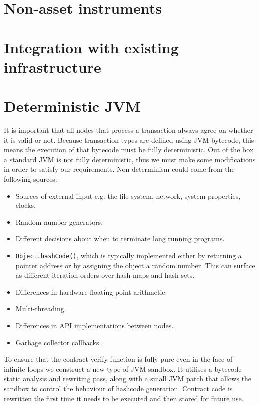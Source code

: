 \documentclass{article}
\begin{document}

\section{Non-asset instruments}
\section{Integration with existing infrastructure}

\section{Deterministic JVM}

It is important that all nodes that process a transaction always agree on whether it is valid or not. Because
transaction types are defined using JVM bytecode, this means the execution of that bytecode must be fully
deterministic. Out of the box a standard JVM is not fully deterministic, thus we must make some modifications
in order to satisfy our requirements. Non-determinism could come from the following sources:

\begin{itemize}
\item Sources of external input e.g. the file system, network, system properties, clocks.
\item Random number generators.
\item Different decisions about when to terminate long running programs.
\item \texttt{Object.hashCode()}, which is typically implemented either by returning a pointer address or by
assigning the object a random number. This can surface as different iteration orders over hash maps and hash sets.
\item Differences in hardware floating point arithmetic.
\item Multi-threading.
\item Differences in API implementations between nodes.
\item Garbage collector callbacks.
\end{itemize}

To ensure that the contract verify function is fully pure even in the face of infinite loops we construct a new
type of JVM sandbox. It utilises a bytecode static analysis and rewriting pass, along with a small JVM patch that
allows the sandbox to control the behaviour of hashcode generation. Contract code is rewritten the first time
it needs to be executed and then stored for future use.
\end{document}
